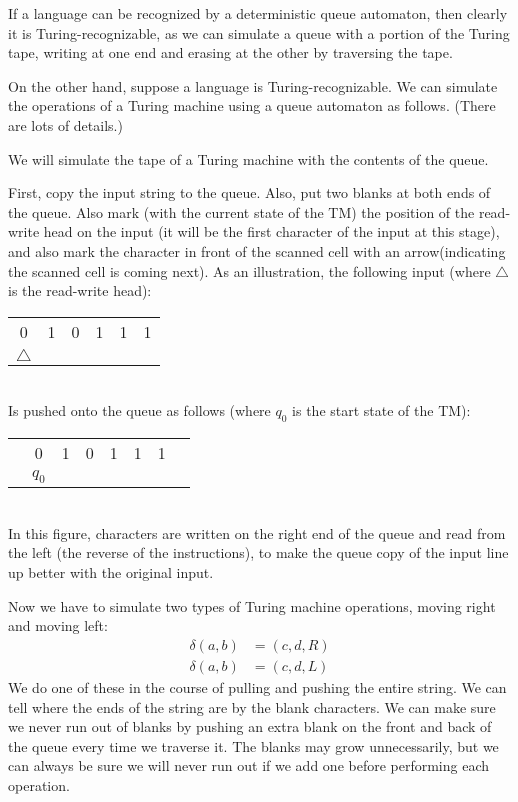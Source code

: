 \documentclass{article}
\begin{document}
\begin{enumerate}
\hrulefill

  If a language can be recognized by a deterministic queue automaton,
  then clearly it is Turing-recognizable, as we can simulate a queue
  with a portion of the Turing tape, writing at one end and erasing at
  the other by traversing the tape.

  On the other hand, suppose a language is Turing-recognizable.  We
  can simulate the operations of a Turing machine using a queue
  automaton as follows.  (There are lots of details.)

  We will simulate the
  tape of a Turing machine with the contents of the queue.

  First, copy the input string to the queue.  Also, put two blanks at
  both ends of the queue.  Also mark (with the current state of the
  TM) the position of the read-write head on the input (it will be the
  first character of the input at this stage), and also mark the
  character in front of the scanned cell with an arrow(indicating the
  scanned cell is coming next).  As an illustration, the
  following input (where $\triangle$ is the read-write head): \\
  \begin{tabular}{|c|c|c|c|c|c|}\hline
    0 & 1 & 0 & 1 & 1 & 1\\
    $\triangle$ & &&&& \\\hline
  \end{tabular}
  \\
  Is pushed onto the queue as follows (where $q_0$ is the start state
  of the TM):
  \\
  \begin{tabular}{|c|c|c|c|c|c|c|c|}\hline
\textvisiblespace   &     0 & 1 & 0 & 1 & 1 & 1
& \textvisiblespace 
\\
&$q_0$&&&&&&\\\hline
  \end{tabular}
  \\
In this figure, characters are written on the right end of the queue
and read from the left (the reverse of the instructions), to make the
queue copy of the input line up better with the original input.  
  
    

  Now we have to simulate two types of Turing machine operations,
  moving right and moving left:
  \begin{align*}
    \delta(a,b) &= (c,d,R) \\
    \delta(a,b) &= (c,d,L) 
  \end{align*}
We do one of these in the course of pulling and pushing the entire
string.  We can tell where the ends of the string are by the blank
characters.  We can make sure we never run out of blanks by pushing an
extra blank on the front and back of the queue every time we traverse
it.  The blanks may grow unnecessarily, but we can always be sure we
will never run out if we add one before performing each operation.


\end{enumerate}
\end{document}
